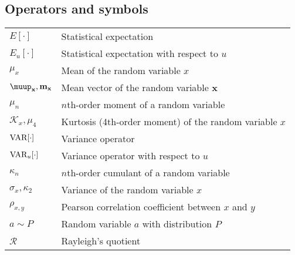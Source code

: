 \documentclass{article}
\begin{document}
\subsection{Operators and symbols}
\begin{xltabular}{\textwidth}{XX}
    \(E\left[ \cdot \right]\) & Statistical expectation\\
    \(E_u\left[ \cdot \right]\) & Statistical expectation with respect to \(u\)\\
    \(\mu_x\) & Mean of the random variable \(x\) \\
    \(\boldsymbol{\muup}_\mathbf{x}, \mathbf{m}_\mathbf{x}\) & Mean vector of the random variable \(\mathbf{x}\)\\
    \(\mu_n\) & \(n\)th-order moment of a random variable \\
    \(\mathcal{K}_x, \mu_4\) & Kurtosis (4th-order moment) of the random variable \(x\)\\
    \(\textnormal{VAR}[\cdot]\) & Variance operator\\
    \(\textnormal{VAR}_u[\cdot]\) & Variance operator with respect to \(u\)\\
    \(\kappa_n\) & \(n\)th-order cumulant of a random variable \\
    \(\sigma_x, \kappa_2\) & Variance of the random variable \(x\)\\
    \(\rho_{x,y}\) & Pearson correlation coefficient between \(x\) and \(y\)\\
    \(a\sim P\) & Random variable \(a\) with distribution \(P\) \\
    \(\mathcal{R}\) & Rayleigh's quotient
\end{xltabular}
\end{document}
